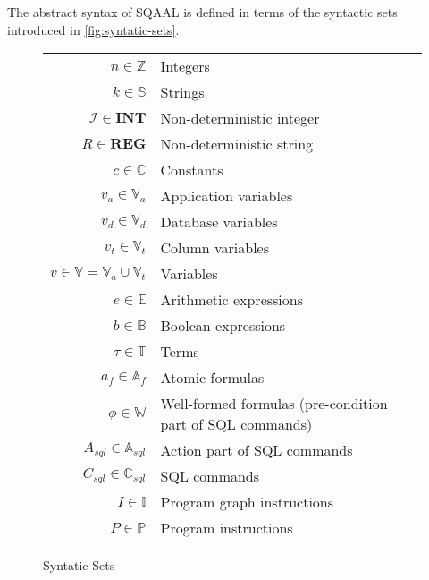 The abstract syntax of SQAAL is defined in terms of the syntactic sets introduced in \autoref{fig:syntatic-sets}.
\begin{figure}[htb!]
     \center
    \begin{tabular}{r p{ }}
    $n \in \mathbb{Z}$                          & Integers                                                   \\
    $k \in \mathbb{S}$                          & Strings                                                    \\
    $\mathscr{I} \in \mathbf{INT}$                          & Non-deterministic integer                                                   \\
    $R \in \mathbf{REG}$                          & Non-deterministic string                                                   \\
    $c \in \mathbb{C}$                          & Constants                                                 \\
    $v_a \in \mathbb{V}_a$                      & Application variables                                     \\
    $v_d \in \mathbb{V}_d$                      & Database variables \\
    $v_t \in \mathbb{V}_t$                    & Column variables   \\
    $v \in \mathbb{V} = \mathbb{V}_a \cup \mathbb{V}_t$ & Variables                                                 \\
    $e \in \mathbb{E}$                          & Arithmetic expressions                                    \\
    $b \in \mathbb{B}$                          & Boolean expressions                                       \\
    $\tau \in \mathbb{T}$                       & Terms                                                     \\
    $a_f \in \mathbb{A}_f$                      & Atomic formulas                                           \\
    $\phi  \in \mathbb{W}$                      & Well-formed formulas (pre-condition part of SQL commands) \\
    $A_{sql} \in \mathbb{A}_{sql}$              & Action part of SQL commands                               \\
    $C_{sql} \in \mathbb{C}_{sql}$              & SQL commands                                              \\
    $I \in \mathbb{I}$                          & Program graph instructions                                     \\
    $P \in \mathbb{P}$                        & Program instructions                                            \\
    \end{tabular}
    \caption{Syntatic Sets}
    \label{fig:syntatic-sets}
\end{figure}

